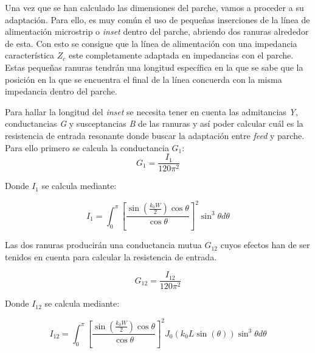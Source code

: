 \par Una vez que se han calculado las dimensiones del parche, vamos a proceder a su adaptación. Para ello, es muy común el uso de pequeñas inserciones de la línea de alimentación microstrip o \textit{inset}  dentro del parche, abriendo dos ranuras alrededor de esta. Con esto se consigue que la línea de alimentación con una impedancia característica $Z_{c}$ este completamente adaptada en impedancias con el parche. Estas pequeñas ranuras tendrán una longitud específica en la que se sabe que la posición en la que se encuentra el final de la línea concuerda con la misma impedancia dentro del parche.
\\
\par Para hallar la longitud del \textit{inset} se necesita tener en cuenta las admitancias \textit{Y}, conductancias \textit{G} y susceptancias \textit{B} de las ranuras y así poder calcular cuál es la resistencia de entrada resonante donde buscar la adaptación entre \textit{feed} y parche. Para ello primero se calcula la conductancia \textit{$G_{1}$}:
\\
\begin{equation}
	G_{1}=\frac{I_{1}}{120\pi^{2}}
	\label{eq:g1}
\end{equation}

\par Donde \textit{$I_{1}$} se calcula mediante:

\begin{equation}
	I_{1}=\int_{0}^{\pi}\left [ \frac{\sin(\frac{k_{0}W}{2})\cos\theta } {\cos\theta} \right ]^{2}\sin^{3}\theta d\theta
	\label{eq:I1}
\end{equation}

\par Las dos ranuras  producirán una conductancia mutua \textit{$G_{12}$} cuyos efectos han de ser tenidos en cuenta para calcular la resistencia de entrada.

\begin{equation}
	G_{12}=\frac{I_{12}}{120\pi^{2}}
	\label{eq:g12}
\end{equation}

\par Donde \textit{$I_{12}$} se calcula mediante:

\begin{equation}
	I_{12}=\int_{0}^{\pi}\left [ \frac{\sin(\frac{k_{0}W}{2})\cos\theta } {\cos\theta} \right ]^{2} J_{0}(k_{0}L\sin(\theta)) 
 \sin^{3}\theta d\theta
	\label{eq:I12}
\end{equation}

